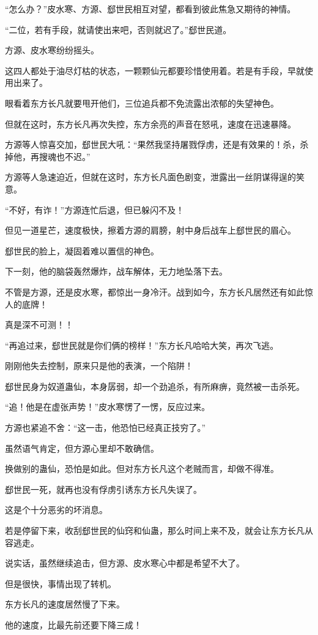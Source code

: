 \begin{this_body}
“怎么办？”皮水寒、方源、郄世民相互对望，都看到彼此焦急又期待的神情。

“二位，若有手段，就请使出来吧，否则就迟了。”郄世民道。

方源、皮水寒纷纷摇头。

这四人都处于油尽灯枯的状态，一颗颗仙元都要珍惜使用着。若是有手段，早就使用出来了。

眼看着东方长凡就要甩开他们，三位追兵都不免流露出浓郁的失望神色。

但就在这时，东方长凡再次失控，东方余亮的声音在怒吼，速度在迅速暴降。

方源等人惊喜交加，郄世民大吼：“果然我坚持屠戮俘虏，还是有效果的！杀，杀掉他，再搜魂也不迟。”

方源等人急速迫近，但就在这时，东方长凡面色剧变，泄露出一丝阴谋得逞的笑意。

“不好，有诈！”方源连忙后退，但已躲闪不及！

但见一道星芒，速度极快，擦着方源的肩膀，射中身后战车上郄世民的眉心。

郄世民的脸上，凝固着难以置信的神色。

下一刻，他的脑袋轰然爆炸，战车解体，无力地坠落下去。

不管是方源，还是皮水寒，都惊出一身冷汗。战到如今，东方长凡居然还有如此惊人的底牌！

真是深不可测！！

“再追过来，郄世民就是你们俩的榜样！”东方长凡哈哈大笑，再次飞逃。

刚刚他失去控制，原来只是他的表演，一个陷阱！

郄世民身为奴道蛊仙，本身孱弱，却一个劲追杀，有所麻痹，竟然被一击杀死。

“追！他是在虚张声势！”皮水寒愣了一愣，反应过来。

方源也紧追不舍：“这一击，他恐怕已经真正技穷了。”

虽然语气肯定，但方源心里却不敢确信。

换做别的蛊仙，恐怕是如此。但对东方长凡这个老贼而言，却做不得准。

郄世民一死，就再也没有俘虏引诱东方长凡失误了。

这是个十分恶劣的坏消息。

若是停留下来，收刮郄世民的仙窍和仙蛊，那么时间上来不及，就会让东方长凡从容逃走。

说实话，虽然继续追击，但方源、皮水寒心中都是希望不大了。

但是很快，事情出现了转机。

东方长凡的速度居然慢了下来。

他的速度，比最先前还要下降三成！


\end{this_body}
